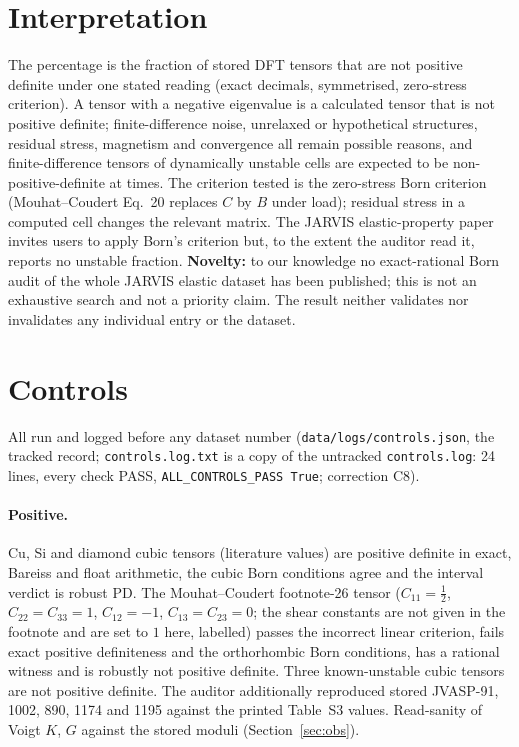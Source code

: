 \documentclass[10pt]{article}
\begin{document}
\section{Interpretation}\label{sec:interp}
The percentage is the fraction of stored DFT tensors that are not positive definite under one stated reading (exact decimals, symmetrised, zero-stress criterion). A tensor with a negative eigenvalue is a calculated tensor that is not positive definite; finite-difference noise, unrelaxed or hypothetical structures, residual stress, magnetism and convergence all remain possible reasons, and finite-difference tensors of dynamically unstable cells are expected to be non-positive-definite at times. The criterion tested is the zero-stress Born criterion (Mouhat--Coudert Eq.~20 replaces $C$ by $B$ under load); residual stress in a computed cell changes the relevant matrix. The JARVIS elastic-property paper~\cite{jarvis_elastic} invites users to apply Born's criterion but, to the extent the auditor read it, reports no unstable fraction. \textbf{Novelty:} to our knowledge no exact-rational Born audit of the whole JARVIS elastic dataset has been published; this is not an exhaustive search and not a priority claim. The result neither validates nor invalidates any individual entry or the dataset.

\section{Controls}\label{sec:controls}
All run and logged before any dataset number (\texttt{data/logs/controls.json}, the tracked record; \texttt{controls.log.txt} is a copy of the untracked \texttt{controls.log}: 24 lines, every check PASS, \texttt{ALL\_CONTROLS\_PASS True}; correction C8).
\paragraph{Positive.} Cu, Si and diamond cubic tensors (literature values) are positive definite in exact, Bareiss and float arithmetic, the cubic Born conditions agree and the interval verdict is robust PD. The Mouhat--Coudert footnote-26 tensor ($C_{11}=\tfrac12$, $C_{22}=C_{33}=1$, $C_{12}=-1$, $C_{13}=C_{23}=0$; the shear constants are not given in the footnote and are set to $1$ here, labelled) passes the incorrect linear criterion, fails exact positive definiteness and the orthorhombic Born conditions, has a rational witness and is robustly not positive definite. Three known-unstable cubic tensors are not positive definite. The auditor additionally reproduced stored JVASP-91, 1002, 890, 1174 and 1195 against the printed Table~S3 values. Read-sanity of Voigt $K$, $G$ against the stored moduli (Section~\ref{sec:obs}).
\end{document}

